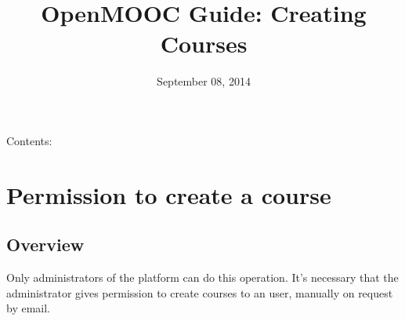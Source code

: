 \documentclass[letterpaper,10pt,english]{sphinxmanual}
\title{OpenMOOC Guide: Creating Courses}
\date{September 08, 2014}
\author{}
\begin{document}
\maketitle
\tableofcontents
{}\label{index::doc}


Contents:


\chapter{Permission to create a course}
\label{permission_to_create_a_course:permission-to-create-a-course}\label{permission_to_create_a_course::doc}\label{permission_to_create_a_course:openmooc-guide-creating-courses}\label{permission_to_create_a_course:id1}

\section{Overview}
\label{permission_to_create_a_course:overview}
Only administrators of the platform can do this operation. It's necessary that the administrator gives permission to create courses to an user, manually on request by email.
\end{document}
